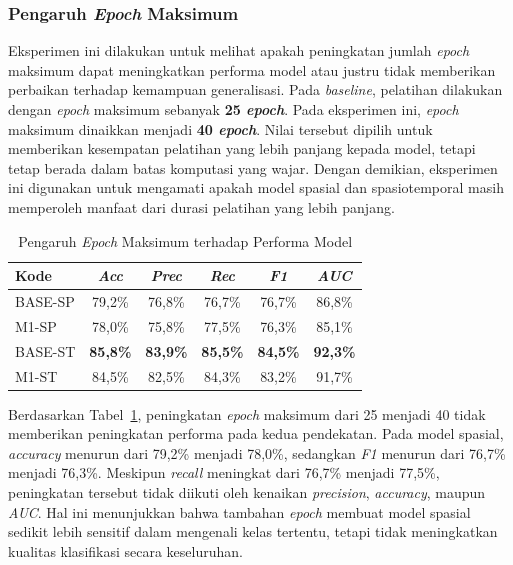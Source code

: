 \subsubsection{Pengaruh \textit{Epoch} Maksimum} \label{IV.Eksperimen_Ablation_Epoch}
Eksperimen ini dilakukan untuk melihat apakah peningkatan jumlah \textit{epoch} maksimum dapat meningkatkan performa model atau justru tidak memberikan perbaikan terhadap kemampuan generalisasi. Pada \textit{baseline}, pelatihan dilakukan dengan \textit{epoch} maksimum sebanyak \textbf{25 \textit{epoch}}. Pada eksperimen ini, \textit{epoch} maksimum dinaikkan menjadi \textbf{40 \textit{epoch}}. Nilai tersebut dipilih untuk memberikan kesempatan pelatihan yang lebih panjang kepada model, tetapi tetap berada dalam batas komputasi yang wajar. Dengan demikian, eksperimen ini digunakan untuk mengamati apakah model spasial dan spasiotemporal masih memperoleh manfaat dari durasi pelatihan yang lebih panjang.

\begin{table}[htbp]
\centering
\caption{Pengaruh \textit{Epoch} Maksimum terhadap Performa Model}
\label{table:4.ablation-epoch}
\begin{tabular}{lccccc}
\toprule
\textbf{Kode} &
\textbf{\textit{Acc}} &
\textbf{\textit{Prec}} &
\textbf{\textit{Rec}} &
\textbf{\textit{F1}} &
\textbf{\textit{AUC}} \\
\midrule
BASE-SP & 79,2\% & 76,8\% & 76,7\% & 76,7\% & 86,8\% \\
M1-SP & 78,0\% & 75,8\% & 77,5\% & 76,3\% & 85,1\% \\
\midrule
BASE-ST & \textbf{85,8\%} & \textbf{83,9\%} & \textbf{85,5\%} & \textbf{84,5\%} & \textbf{92,3\%} \\
M1-ST & 84,5\% & 82,5\% & 84,3\% & 83,2\% & 91,7\% \\
\bottomrule
\end{tabular}
\end{table}

Berdasarkan Tabel~\ref{table:4.ablation-epoch}, peningkatan \textit{epoch} maksimum dari 25 menjadi 40 tidak memberikan peningkatan performa pada kedua pendekatan. Pada model spasial, \textit{accuracy} menurun dari 79,2\% menjadi 78,0\%, sedangkan \textit{F1} menurun dari 76,7\% menjadi 76,3\%. Meskipun \textit{recall} meningkat dari 76,7\% menjadi 77,5\%, peningkatan tersebut tidak diikuti oleh kenaikan \textit{precision}, \textit{accuracy}, maupun \textit{AUC}. Hal ini menunjukkan bahwa tambahan \textit{epoch} membuat model spasial sedikit lebih sensitif dalam mengenali kelas tertentu, tetapi tidak meningkatkan kualitas klasifikasi secara keseluruhan.

